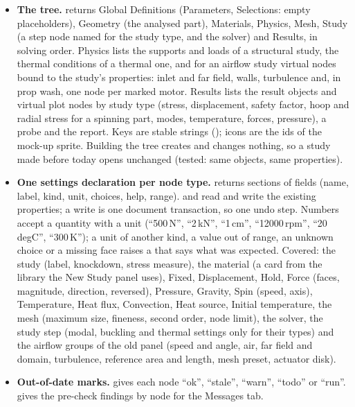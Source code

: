 \begin{itemize}[nosep]
  \item \textbf{The tree.}  returns Global Definitions (Parameters, Selections: empty
        placeholders), Geometry (the analysed part), Materials, Physics, Mesh, Study (a step node named for the study
        type, and the solver) and Results, in solving order. Physics lists the supports and loads of a structural
        study, the thermal conditions of a thermal one, and for an airflow study virtual nodes bound to the study's
        properties: inlet and far field, walls, turbulence and, in prop wash, one node per marked motor. Results
        lists the result objects and virtual plot nodes by study type (stress, displacement, safety factor, hoop and
        radial stress for a spinning part, modes, temperature, forces, pressure), a probe and the report. Keys are
        stable strings (); icons are the ids of the mock-up sprite. Building the tree creates and
        changes nothing, so a study made before today opens unchanged (tested: same objects, same properties).
  \item \textbf{One settings declaration per node type.}  returns sections of fields (name,
        label, kind, unit, choices, help, range).  and  read and write the existing
        properties; a write is one document transaction, so one undo step. Numbers accept a quantity with a unit
        (``500\,N'', ``2\,kN'', ``1\,cm'', ``12000\,rpm'', ``20\,degC'', ``300\,K''); a unit of another kind, a value
        out of range, an unknown choice or a missing face raises a  that says what was expected.
        Covered: the study (label, knockdown, stress measure), the material (a card from the library the New Study
        panel uses), Fixed, Displacement, Hold, Force (faces, magnitude, direction, reversed), Pressure, Gravity, Spin
        (speed, axis), Temperature, Heat flux, Convection, Heat source, Initial temperature, the mesh (maximum size,
        fineness, second order, node limit), the solver, the study step (modal, buckling and thermal settings only for
        their types) and the airflow groups of the old panel (speed and angle, air, far field and domain, turbulence,
        reference area and length, mesh preset, actuator disk).
  \item \textbf{Out-of-date marks.}  gives each node ``ok'', ``stale'', ``warn'', ``todo'' or
        ``run''.  gives the pre-check findings by node for the Messages tab.
\end{itemize}

